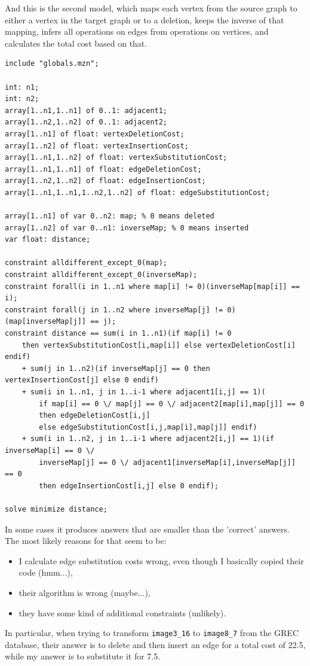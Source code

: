 \documentclass{article}
\theoremstyle{definition}
\begin{document}
And this is the second model, which maps each vertex from the source graph to either a vertex in the target graph or to a deletion, keeps the inverse of that mapping, infers all operations on edges from operations on vertices, and calculates the total cost based on that.
\begin{lstlisting}
include "globals.mzn";

int: n1;
int: n2;
array[1..n1,1..n1] of 0..1: adjacent1;
array[1..n2,1..n2] of 0..1: adjacent2;
array[1..n1] of float: vertexDeletionCost;
array[1..n2] of float: vertexInsertionCost;
array[1..n1,1..n2] of float: vertexSubstitutionCost;
array[1..n1,1..n1] of float: edgeDeletionCost;
array[1..n2,1..n2] of float: edgeInsertionCost;
array[1..n1,1..n1,1..n2,1..n2] of float: edgeSubstitutionCost;

array[1..n1] of var 0..n2: map; % 0 means deleted
array[1..n2] of var 0..n1: inverseMap; % 0 means inserted
var float: distance;

constraint alldifferent_except_0(map);
constraint alldifferent_except_0(inverseMap);
constraint forall(i in 1..n1 where map[i] != 0)(inverseMap[map[i]] == i);
constraint forall(j in 1..n2 where inverseMap[j] != 0)(map[inverseMap[j]] == j);
constraint distance == sum(i in 1..n1)(if map[i] != 0
    then vertexSubstitutionCost[i,map[i]] else vertexDeletionCost[i] endif)
    + sum(j in 1..n2)(if inverseMap[j] == 0 then vertexInsertionCost[j] else 0 endif)
    + sum(i in 1..n1, j in 1..i-1 where adjacent1[i,j] == 1)(
        if map[i] == 0 \/ map[j] == 0 \/ adjacent2[map[i],map[j]] == 0
        then edgeDeletionCost[i,j]
        else edgeSubstitutionCost[i,j,map[i],map[j]] endif)
    + sum(i in 1..n2, j in 1..i-1 where adjacent2[i,j] == 1)(if inverseMap[i] == 0 \/
        inverseMap[j] == 0 \/ adjacent1[inverseMap[i],inverseMap[j]] == 0
        then edgeInsertionCost[i,j] else 0 endif);

solve minimize distance;
\end{lstlisting}
In some cases it produces answers that are smaller than the 'correct' answers. The most likely reasons for that seem to be:
\begin{itemize}
\item I calculate edge substitution costs wrong, even though I basically copied their code (hmm...),
\item their algorithm is wrong (maybe...),
\item they have some kind of additional constraints (unlikely).
\end{itemize}
In particular, when trying to transform \texttt{image3\_16} to \texttt{image8\_7} from the GREC database, their answer is to delete and then insert an edge for a total cost of 22.5, while my answer is to substitute it for 7.5.
\end{document}

